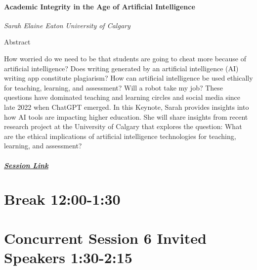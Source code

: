\documentclass[
]{book}
\begin{document}
\begin{keynote}
\hypertarget{academic-integrity-in-the-age-of-artificial-intelligence}{%
\paragraph*{Academic Integrity in the Age of Artificial
Intelligence}\label{academic-integrity-in-the-age-of-artificial-intelligence}}

\emph{Sarah Elaine Eaton} \emph{University of Calgary}

Abstract

How worried do we need to be that students are going to cheat more
because of artificial intelligence? Does writing generated by an
artificial intelligence (AI) writing app constitute plagiarism? How can
artificial intelligence be used ethically for teaching, learning, and
assessment? Will a robot take my job? These questions have dominated
teaching and learning circles and social media since late 2022 when
ChatGPT emerged. In this Keynote, Sarah provides insights into how AI
tools are impacting higher education. She will share insights from
recent research project at the University of Calgary that explores the
question: What are the ethical implications of artificial intelligence
technologies for teaching, learning, and assessment?

\hypertarget{session-link}{%
\subparagraph*{\texorpdfstring{\href{}{Session
Link}}{Session Link}}\label{session-link}}
\end{keynote}

\hypertarget{break-1200-130}{%
\section*{Break \textbar{} 12:00-1:30}\label{break-1200-130}}

\hypertarget{concurrent-session-6-invited-speakers-130-215}{%
\section*{Concurrent Session 6 \textbar{} Invited Speakers \textbar{} 1:30-2:15}\label{concurrent-session-6-invited-speakers-130-215}}
\end{document}
